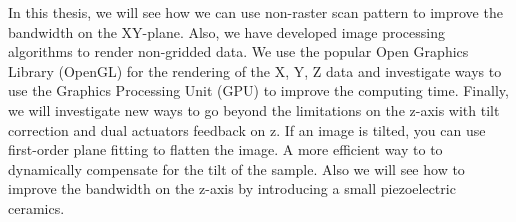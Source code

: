 In this thesis, we will see how we can use non-raster scan pattern to improve the bandwidth on the XY-plane. Also, we have developed image processing algorithms to render non-gridded data. We use the popular Open Graphics Library (OpenGL) for the rendering of the X, Y, Z data and investigate ways to use the Graphics Processing Unit (GPU) to improve the computing time.
Finally, we will investigate new ways to go beyond the limitations on the z-axis with tilt correction and dual actuators feedback on z. If an image is tilted, you can use first-order plane fitting to flatten the image. A more efficient way to to dynamically compensate for the tilt of the sample. Also we will see how to improve the bandwidth on the z-axis by introducing a small piezoelectric ceramics.
